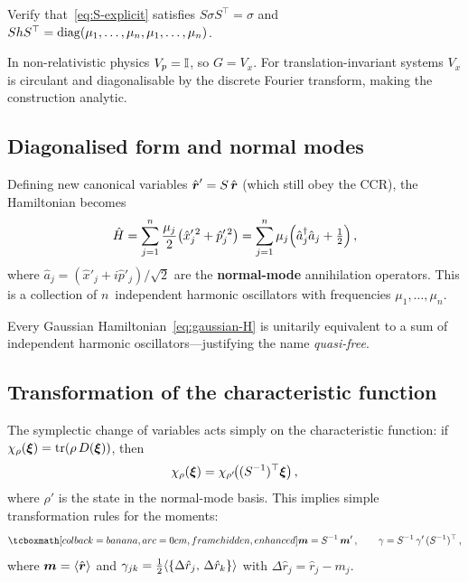 \begin{exercise}\label{ex:verify-S}
  Verify that~\eqref{eq:S-explicit} satisfies $S\sigma S^\top = \sigma$
  and $ShS^\top = \operatorname{diag}(\mu_1,\ldots,\mu_n,\mu_1,\ldots,\mu_n)$.
\end{exercise}

\begin{intuition}
  In non-relativistic physics $V_p = \mathbb{I}$, so $G = V_x$.  For
  translation-invariant systems $V_x$ is circulant and diagonalisable
  by the discrete Fourier transform, making the construction analytic.
\end{intuition}

\subsection{Diagonalised form and normal modes}%
\label{sec:normal-modes}

Defining new canonical variables
$\hat{\boldsymbol{r}}' = S\,\hat{\boldsymbol{r}}$ (which still obey the CCR), the
Hamiltonian becomes
\begin{equation}\label{eq:H-diagonal}
  \hat{H}
  = \sum_{j=1}^{n} \frac{\mu_j}{2}
    \bigl(\hat{x}_j'^{\,2} + \hat{p}_j'^{\,2}\bigr)
  = \sum_{j=1}^{n} \mu_j
    \Bigl(\hat{a}_j^\dagger \hat{a}_j + \tfrac{1}{2}\Bigr)\,,
\end{equation}
where $\hat{a}_j = (\hat{x}'_j + i\hat{p}'_j)/\sqrt{2}$ are the
\textbf{normal-mode} annihilation operators.  This is a collection of
$n$~independent harmonic oscillators with frequencies
$\mu_1,\ldots,\mu_n$.

\begin{keyresult}
  Every Gaussian Hamiltonian~\eqref{eq:gaussian-H} is unitarily
  equivalent to a sum of independent harmonic oscillators---justifying
  the name \emph{quasi-free}.
\end{keyresult}

\subsection{Transformation of the characteristic function}%
\label{sec:char-fn-transform}

The symplectic change of variables acts simply on the characteristic
function: if $\chi_\rho(\boldsymbol{\xi}) = \operatorname{tr}(\rho\, D(\boldsymbol{\xi}))$, then
\begin{equation}\label{eq:chi-transform}
  \chi_\rho(\boldsymbol{\xi})
  = \chi_{\rho'}\!\bigl((S^{-1})^\top \boldsymbol{\xi}\bigr)\,,
\end{equation}
where $\rho'$ is the state in the normal-mode basis.
This implies simple transformation rules for the moments:
\begin{equation}\label{eq:moments-transform}
  \eqbox{\vb{m} = S^{-1}\,\vb{m}'\,,
  \qquad
  \gamma = S^{-1}\,\gamma'\,(S^{-1})^\top}\,,
\end{equation}
where $\boldsymbol{m} = \langle \hat{\boldsymbol{r}} \rangle$ and
$\gamma_{jk} = \tfrac{1}{2}\langle \{\Delta\hat{r}_j,\,\Delta\hat{r}_k\} \rangle$
with $\Delta\hat{r}_j = \hat{r}_j - m_j$.

